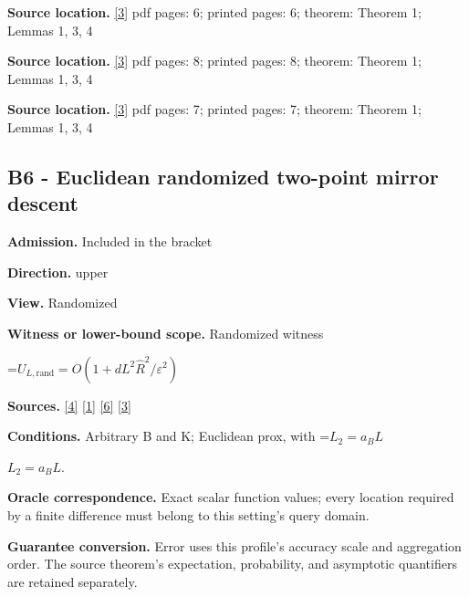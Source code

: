 \documentclass[10pt,a4paper]{article}
\newcommand{\AtlasMath}[1]{\par\begingroup\centering\setbox0=\hbox{$\displaystyle #1$}\ifdim\wd0>1.4\linewidth\typeout{ATLAS WIDE FORMULA: \the\wd0}\fi\ifdim\wd0>\linewidth\resizebox{\linewidth}{!}{\box0}\else\box0\fi\par\endgroup}
\newcommand{\AtlasInlineMath}[1]{\begingroup\setbox0=\hbox{$#1$}\ifdim\wd0>.4\linewidth\endgroup\AtlasMath{#1}\else\endgroup$#1$\fi}
\begin{document}
\textbf{Source location.} \href{https://proceedings.neurips.cc/paper_files/paper/2022/file/329ef22fd8cb68223d5df09a037f7dd9-Paper-Conference.pdf}{[3]} pdf pages: 6; printed pages: 6; theorem: Theorem 1; Lemmas 1, 3, 4



\textbf{Source location.} \href{https://proceedings.neurips.cc/paper_files/paper/2022/file/329ef22fd8cb68223d5df09a037f7dd9-Paper-Conference.pdf}{[3]} pdf pages: 8; printed pages: 8; theorem: Theorem 1; Lemmas 1, 3, 4



\textbf{Source location.} \href{https://proceedings.neurips.cc/paper_files/paper/2022/file/329ef22fd8cb68223d5df09a037f7dd9-Paper-Conference.pdf}{[3]} pdf pages: 7; printed pages: 7; theorem: Theorem 1; Lemmas 1, 3, 4



\subsection{B6 - Euclidean randomized two-point mirror descent}


\textbf{Admission.} Included in the bracket



\textbf{Direction.} upper



\textbf{View.} Randomized



\textbf{Witness or lower-bound scope.} Randomized witness



\AtlasMath{U_{L,\mathrm{rand}}=O(1+dL^2\widehat{R}^2/\varepsilon^2)}


\textbf{Sources.} \href{https://jmlr.org/papers/volume18/16-632/16-632.pdf}{[4]} \href{https://arxiv.org/html/2610.00345v1}{[1]} \href{https://arxiv.org/abs/1802.09022}{[6]} \href{https://proceedings.neurips.cc/paper_files/paper/2022/file/329ef22fd8cb68223d5df09a037f7dd9-Paper-Conference.pdf}{[3]}



\textbf{Conditions.} Arbitrary B and K; Euclidean prox, with \AtlasInlineMath{L_2=a_BL}.



\textbf{Oracle correspondence.} Exact scalar function values; every location required by a finite difference must belong to this setting's query domain.



\textbf{Guarantee conversion.} Error uses this profile's accuracy scale and aggregation order. The source theorem's expectation, probability, and asymptotic quantifiers are retained separately.
\end{document}
